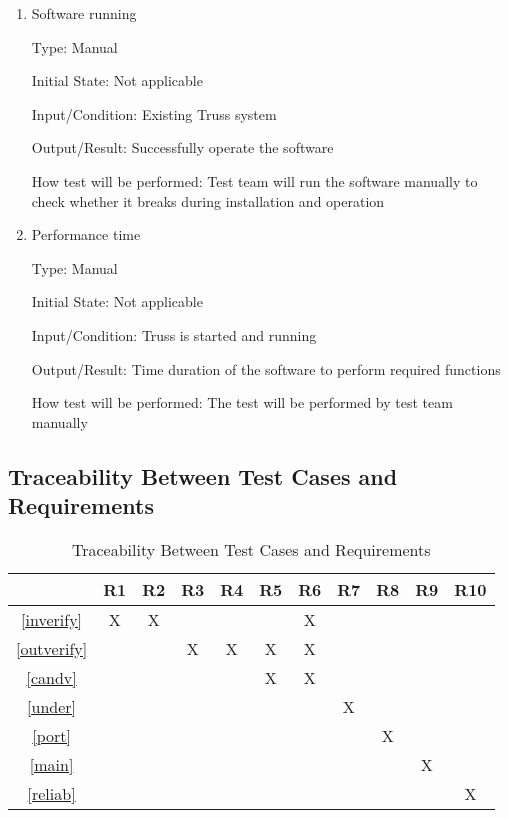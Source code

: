 \documentclass[12pt, titlepage]{article}
\begin{document}
\begin{enumerate}
	
	\item{Software running\\}
	
	Type: Manual
	
	Initial State: Not applicable
	
	Input/Condition: Existing Truss system
	
	Output/Result: Successfully operate the software
	
	How test will be performed: Test team will run the software manually to 
	check whether it breaks during installation and operation
	
	\item{Performance time\\}
	
	Type: Manual
	
	Initial State: Not applicable
	
	Input/Condition: Truss is started and running
	
	Output/Result: Time duration of the software to perform required functions
	
	How test will be performed: The test will be performed by test team manually
	
\end{enumerate}

\subsection{Traceability Between Test Cases and Requirements}

\begin{table}[h!]
	\centering
	\begin{tabular}{|c|c|c|c|c|c|c|c|c|c|c|}
		\hline
		& R1 & R2 & R3 & R4 & R5 & R6 & R7 & R8 & R9 & R10\\
		\hline
		\ref{inverify}    &X &X & & & &X & & & &\\ \hline
		\ref{outverify}   & & &X &X &X &X & & & &\\ \hline
		\ref{candv}       & & & & &X &X & & & &\\ \hline
		\ref{under}       & & & & & & &X & & &\\ \hline
		\ref{port}        & & & & & & & &X & &\\ \hline
		\ref{main}        & & & & & & & & &X &\\ \hline
		\ref{reliab}      & & & & & & & & & &X\\ \hline
	\end{tabular}
	\caption{Traceability Between Test Cases and Requirements}
	\label{Table:A_trace}
\end{table}
\end{document}

